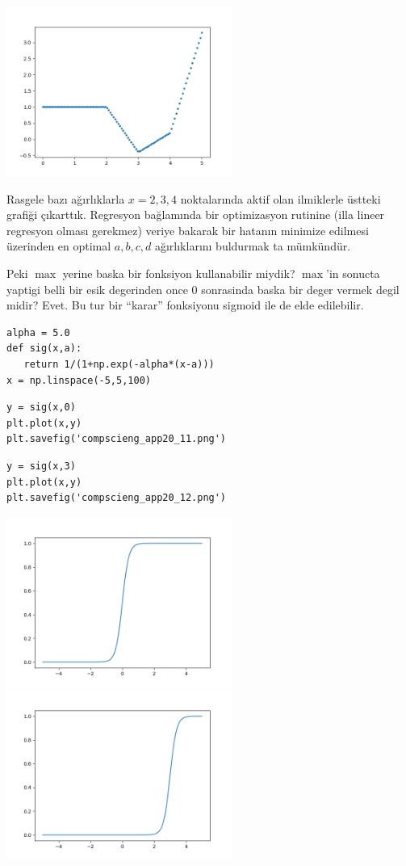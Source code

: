 \documentclass[12pt,fleqn]{article}\usepackage{../../common}
\begin{document}
\includegraphics[width=20em]{compscieng_app20_10.png}

Rasgele bazı ağırlıklarla $x=2,3,4$ noktalarında aktif olan ilmiklerle
üstteki grafiği çıkarttık. Regresyon bağlamında bir optimizasyon rutinine
(illa lineer regresyon olması gerekmez) veriye bakarak bir hatanın minimize
edilmesi üzerinden en optimal $a,b,c,d$ ağırlıklarını buldurmak ta
mümkündür. 

Peki $\max$ yerine baska bir fonksiyon kullanabilir miydik? $\max$'in
sonucta yaptigi belli bir esik degerinden once 0 sonrasinda baska bir deger
vermek degil midir? Evet. Bu tur bir ``karar'' fonksiyonu sigmoid ile de
elde edilebilir. 

\begin{verbatim}
alpha = 5.0
def sig(x,a):
   return 1/(1+np.exp(-alpha*(x-a)))
x = np.linspace(-5,5,100)
\end{verbatim}

\begin{verbatim}
y = sig(x,0)
plt.plot(x,y)
plt.savefig('compscieng_app20_11.png')
\end{verbatim}

\begin{verbatim}
y = sig(x,3)
plt.plot(x,y)
plt.savefig('compscieng_app20_12.png')
\end{verbatim}

\includegraphics[width=20em]{compscieng_app20_11.png}
\includegraphics[width=20em]{compscieng_app20_12.png}
\end{document}
